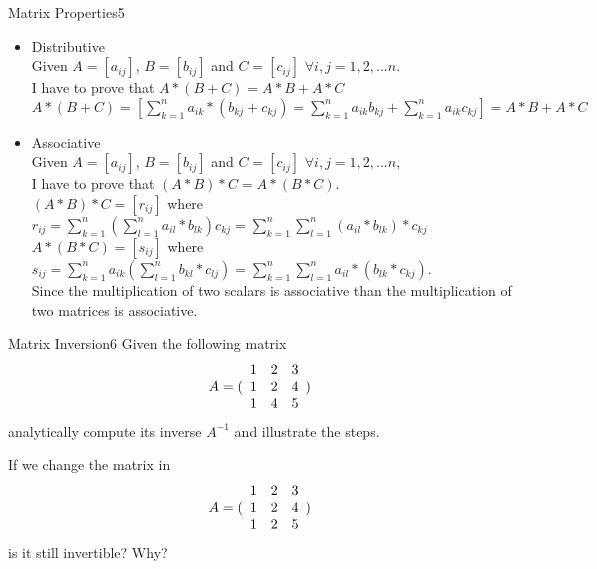 \begin{questions}
\begin{question}{Matrix Properties}{5}
\begin{answer}
\begin{itemize}
\begin{itemize}
\begin{equation*}
		 		\end{equation*}
		 		\item Distributive\\
		 		Given $ A = [ a_{ij} ]$, $ B = [ b_{ij} ]$ and $ C = [ c_{ij} ]$ $\forall i, j =  {1,2,...n}$. \\
		 		I have to prove that $ A*(B + C) = A*B + A*C $ \\
		 		$A*(B + C) =[ \sum_{k=1}^{n} a_{ik}*(b_{kj}+c_{kj}) =\sum_{k=1}^{n} a_{ik}b_{kj} + \sum_{k=1}^{n} a_{ik}c_{kj}]= A*B + A*C$\\
		 		\item Associative \\
		 		Given $ A = [ a_{ij} ]$, $ B = [ b_{ij} ]$ and $ C = [ c_{ij} ]$ $\forall i, j =  {1,2,...n}$, \\
		 		I have to prove that $(A*B)*C=A*(B*C)$. \\
		 		$(A*B)*C =[r_{ij}]$ where $r_{ij} = \sum_{k=1}^{n} (\sum_{l=1}^{n}a_{il}*b_{lk})c_{kj} =\sum_{k=1}^{n} \sum_{l=1}^{n}(a_{il}*b_{lk})*c_{kj} $ \\
		 		$A*(B*C) =[s_{ij}]$ where $s_{ij} = \sum_{k=1}^{n}a_{ik} (\sum_{l=1}^{n}b_{kl}*c_{lj}) = \sum_{k=1}^{n} \sum_{l=1}^{n}a_{il}*(b_{lk}*c_{kj})$.\\
		 			Since the multiplication of two scalars is associative than the multiplication of two matrices is associative.
		 	\end{itemize}
	\end{itemize}
\end{answer}

\end{question}


\begin{question}{Matrix Inversion}{6}
Given the following matrix 
\begin{equation*}
     A = ( \begin{array}{c c c} 
     1 & 2 & 3 \\
     1 & 2 & 4 \\
     1 & 4 & 5 \end{array} )
\end{equation*}
analytically compute its inverse $ A^{-1}$ and illustrate the steps.

If we change the matrix in
\begin{equation*}
     A = ( \begin{array}{c c c} 
     1 & 2 & 3 \\
     1 & 2 & 4 \\
     1 & 2 & 5 \end{array} )
\end{equation*}
is it still invertible? Why?


\end{question}
\end{questions}
